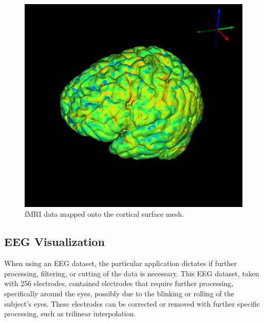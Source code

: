 \begin{figure}[H]
\begin{center}
\includegraphics[width=.75\textwidth]{Figures/fmri_1}
\caption{fMRI data mapped onto the cortical surface mesh.}
\label{fig:fmrivis}
\end{center}
\end{figure}

\subsection{EEG Visualization}

When using an EEG dataset, the particular application dictates if further processing, filtering, or cutting of the data is necessary. This EEG dataset, taken with 256 electrodes, contained electrodes that require further processing, specifically around the eyes, possibly due to the blinking or rolling of the subject's eyes. These electrodes can be corrected or removed with further specific processing, such as trilinear interpolation.

